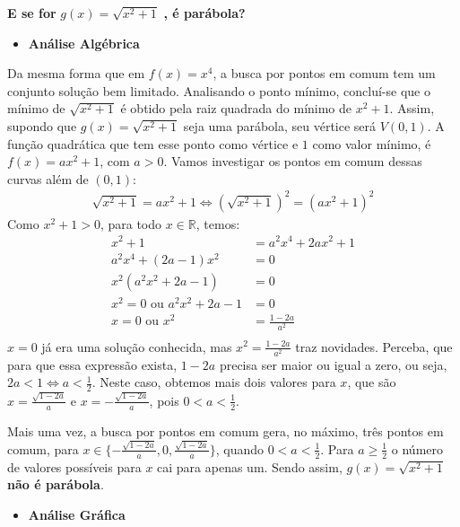 {\begin{observation}
\end{observation}

\textbf{E se for} \(g(x) = \sqrt{x^2+1}\) \textbf{, é parábola?}
\begin{itemize}
\item {} 
\textbf{Análise Algébrica}

\end{itemize}

Da mesma forma que em \(f(x)=x^4\), a busca por pontos em comum tem um conjunto solução bem limitado. Analisando o ponto mínimo, concluí-se que o mínimo de \(\sqrt{x^2+1}\) é obtido pela raiz quadrada do mínimo de \(x^2+1\). Assim, supondo que \(g(x) = \sqrt{x^2+1}\) seja uma parábola, seu vértice será \(V(0,1)\). A função quadrática que tem esse ponto como vértice e \(1\) como valor mínimo, é \(f(x)=ax^2+1\), com \(a>0\). Vamos investigar os pontos em comum dessas curvas além de \((0,1)\):
\begin{equation*}
\begin{split}\sqrt{x^2+1} = ax^2+1 \Leftrightarrow (\sqrt{x^2+1})^2 = (ax^2+1)^2\end{split}
\end{equation*}
Como \(x^2+1>0\), para todo \(x \in \mathbb{R}\), temos:
\begin{equation*}
\begin{split}x^2+1 & =a^2x^4+2ax^2+1 \\
a^2x^4+(2a-1)x^2 & =0 \\
x^2(a^2x^2+2a-1) & =0 \\
x^2=0 \text{ ou } a^2x^2+2a-1 & = 0 \\
x=0 \text{ ou } x^2 & = \frac{1-2a}{a^2} \\\end{split}
\end{equation*}
\(x=0\) já era uma solução conhecida, mas \(x^2 = \frac{1-2a}{a^2}\) traz novidades. Perceba, que para que essa expressão exista, \(1-2a\) precisa ser maior ou igual a zero, ou seja, \(2a<1 \Leftrightarrow a< \frac{1}{2}\). Neste caso, obtemos mais dois valores para \(x\), que são \(\displaystyle x=\frac{\sqrt{1-2a}}{a}\) e \(\displaystyle x=- \frac{\sqrt{1-2a}}{a}\), pois \(0<a<\frac{1}{2}\).

Mais uma vez, a busca por pontos em comum gera, no máximo, três pontos em comum, para \(\displaystyle x \in \{- \frac{\sqrt{1-2a}}{a},0,\frac{\sqrt{1-2a}}{a} \}\), quando \(\displaystyle0<a<\frac{1}{2}\). Para \(\displaystyle a \geq \frac{1}{2}\) o número de valores possíveis para \(x\) cai para apenas um. Sendo assim, \(g(x) = \sqrt{x^2+1}\) \textbf{não é parábola}.
\begin{itemize}
\item {} 
\textbf{Análise Gráfica}


\end{itemize}}
